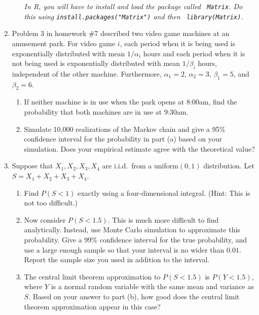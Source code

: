 \documentclass{article}
\begin{document}
\begin{enumerate}
\begin{enumerate}
    {\em In R, you will have to install and load the package called {\tt
    Matrix}. Do this using {\tt install.packages("Matrix")} and then {\tt
    library(Matrix)}.} 
    
    \end{enumerate}

  \item Problem 3 in homework \#7 described two video game machines at an
  amusement park. For video game $i$, each period when it is being used is
  exponentially distributed with mean $1/\alpha_i$ hours and each period when it
  is not being used is exponentially distributed with mean $1/\beta_i$ hours,
  independent of the other machine. Furthermore, $\alpha_1=2$, $\alpha_2=3$,
  $\beta_1=5$, and $\beta_2=6$.
  
    \begin{enumerate}
    
    \item If neither machine is in use when the park opens at 8:00am, find the
    probability that both machines are in use at 9:30am.
    
    \item Simulate 10,000 realizations of the Markov chain and give a 95\%
    confidence interval for the probability in part (a) based on your
    simulation. Does your empirical estimate agree with the theoretical value?
    
    \end{enumerate}
  
  \item Suppose that $X_1, X_2, X_3, X_4$ are i.i.d.~from a uniform$(0,1)$
  distribution. Let $S=X_1+X_2+X_3+X_4$.
  
    \begin{enumerate}
  
    \item Find $P(S<1)$ exactly using a four-dimensional integral. (Hint: This
    is not too difficult.)
    
    \item Now consider $P(S<1.5)$. This is much more difficult to find
    analytically. Instead, use Monte Carlo simulation to approximate this
    probability. Give a 99\% confidence interval for the true probability, and
    use a large enough sample so that your interval is no wider than $0.01$.
    Report the sample size you used in addition to the interval.
    
    \item The central limit theorem approximation to $P(S<1.5)$ is $P(Y<1.5)$,
    where $Y$ is a normal random variable with the same mean and variance as
    $S$. Based on your answer to part (b), how good does the central limit
    theorem approximation appear in this case?
    
    \end{enumerate}

\end{enumerate}
\end{document}
